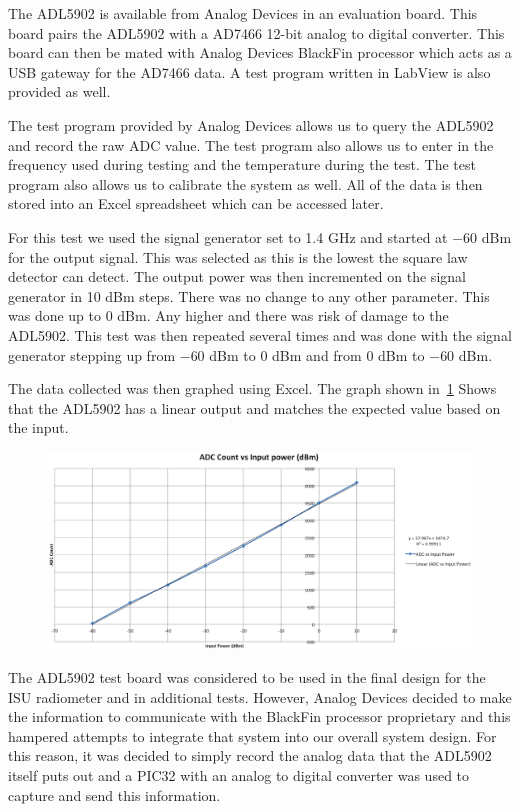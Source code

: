 The ADL5902 is available from Analog Devices in an evaluation board.  This board pairs the ADL5902 with a AD7466 12-bit analog to digital converter.  This board can then be mated with Analog Devices BlackFin processor which acts as a USB gateway for the AD7466 data.  A test program written in LabView is also provided as well.

The test program provided by Analog Devices allows us to query the ADL5902 and record the raw ADC value.  The test program also allows us to enter in the frequency used during testing and the temperature during the test.  The test program also allows us to calibrate the system as well.  All of the data is then stored into an Excel spreadsheet which can be accessed later.

For this test we used the signal generator set to 1.4 GHz and started at $-60$ dBm for the output signal.  This was selected as this is the lowest the square law detector can detect.  The output power was then incremented on the signal generator in 10 dBm steps.  There was no change to any other parameter.  This was done up to 0 dBm.  Any higher and there was risk of damage to the ADL5902.  This test was then repeated several times and was done with the signal generator stepping up from $-60$ dBm to 0 dBm and from 0 dBm to $-60$ dBm.  

The data collected was then graphed using Excel.  The graph shown in~\ref{adl5902_linear}
Shows that the ADL5902 has a linear output and matches the expected value based on the input.  

\begin{figure}[h!tb] \centering

\includegraphics[width=\textwidth]{Images/Linearsquarelaw}

\label{adl5902_linear}
\end{figure}

The ADL5902 test board was considered to be used in the final design for the ISU radiometer and in additional tests.  However, Analog Devices decided to make the information to communicate with the BlackFin processor proprietary and this hampered attempts to integrate that system into our overall system design.  For this reason, it was decided to simply record the analog data that the ADL5902 itself puts out and a PIC32 with an analog to digital converter was used to capture and send this information.

